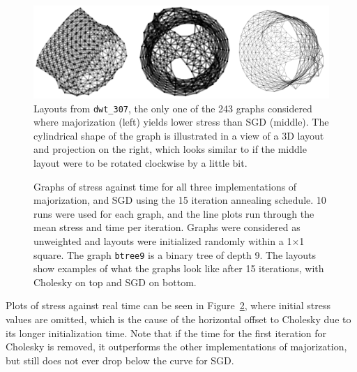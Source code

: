 \begin{figure}
  \centering
  \includegraphics[width=1\textwidth]{stress/dwt_307.png}
  \caption[The one graph in the test set where majorization performs better]{Layouts from \texttt{dwt\_307}, the only one of the 243 graphs considered where majorization (left) yields lower stress than SGD (middle). The cylindrical shape of the graph is illustrated in a view of a 3D layout and projection on the right, which looks similar to if the middle layout were to be rotated clockwise by a little bit.
  }
  \label{fig:cylinder}
\end{figure}

\begin{figure}
  \centering
  \caption[Stress measured on a further selection of graphs]{Graphs of stress against time for all three implementations of majorization, and SGD using the 15 iteration annealing schedule. 10 runs were used for each graph, and the line plots run through the mean stress and time per iteration.
  Graphs were considered as unweighted
  and layouts were initialized randomly within a 1$\times$1 square.
  The graph \texttt{btree9} is a binary tree of depth 9. 
  The layouts show examples of what the graphs look like after 15 iterations, with Cholesky on top and SGD on bottom.
  }
  \label{fig:stress_plots_big}
\end{figure}

Plots of stress against real time can be seen in Figure~\ref{fig:stress_plots_big}, where initial stress values are omitted, which is the cause of the horizontal offset to Cholesky due to its longer initialization time.
Note that if the time for the first iteration for Cholesky is removed, it outperforms the other implementations of majorization, but still does not ever drop below the curve for SGD.


